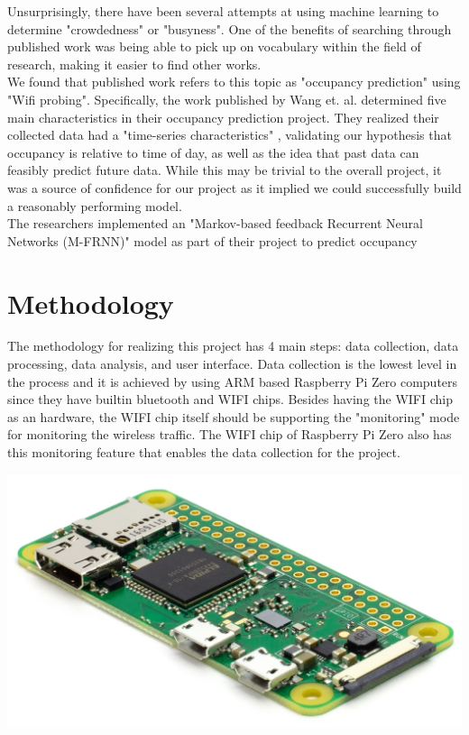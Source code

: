 \documentclass[journal, 11pt]{IEEEtran}
\begin{document}
\noindent Unsurprisingly, there have been several attempts at using machine learning to determine "crowdedness" or "busyness". One of the benefits of searching through published work was being able to pick up on vocabulary within the field of research, making it easier to find other works. \\

\noindent We found that published work refers to this topic as "occupancy prediction" using "Wifi probing"\cite{wang2018occupancy}. Specifically, the work published by Wang et. al. determined five main characteristics in their occupancy prediction project. They realized their collected data had a "time-series characteristics" \cite{wang2018occupancy}, validating our hypothesis that occupancy is relative to time of day, as well as the idea that past data can feasibly predict future data. While this may be trivial to the overall project, it was a source of confidence for our project as it implied we could successfully build a reasonably performing model. \\

\noindent The researchers implemented an "Markov-based feedback Recurrent Neural
Networks (M-FRNN)" \cite{wang2018occupancy} model as part of their project to predict occupancy

\section{Methodology}
\noindent The methodology for realizing this project has 4 main steps: data collection, data processing, data analysis, and user interface. Data collection is the lowest level in the process and it is achieved by using ARM based Raspberry Pi Zero computers since they have builtin bluetooth and WIFI chips. Besides having the WIFI chip as an hardware, the WIFI chip itself should be supporting the "monitoring" mode for monitoring the wireless traffic. The WIFI chip of Raspberry Pi Zero also has this monitoring feature that enables the data collection for the project.

\begingroup
    \center
    \medskip
    \includegraphics[width=0.6\columnwidth]{report/interim_report/images/raspi.png}
    \label{fig:raspi}
    \medskip
\endgroup
\end{document}
